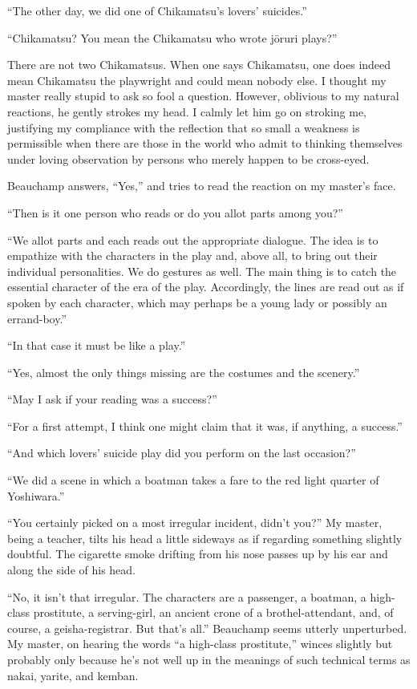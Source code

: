 \documentclass{book}
\begin{document}
``The other day, we did one of Chikamatsu's lovers' suicides.''

``Chikamatsu? You mean the Chikamatsu who wrote jōruri plays?''

There are not two Chikamatsus. When one says Chikamatsu, one does indeed
mean Chikamatsu the playwright and could mean nobody else. I thought my
master really stupid to ask so fool a question. However, oblivious to my
natural reactions, he gently strokes my head. I calmly let him go on
stroking me, justifying my compliance with the reflection that so small
a weakness is permissible when there are those in the world who admit to
thinking themselves under loving observation by persons who merely
happen to be cross-eyed.

Beauchamp answers, ``Yes,'' and tries to read the reaction on my
master's face.

``Then is it one person who reads or do you allot parts among you?''

``We allot parts and each reads out the appropriate dialogue. The idea
is to empathize with the characters in the play and, above all, to bring
out their individual personalities. We do gestures as well. The main
thing is to catch the essential character of the era of the play.
Accordingly, the lines are read out as if spoken by each character,
which may perhaps be a young lady or possibly an errand-boy.''

``In that case it must be like a play.''

``Yes, almost the only things missing are the costumes and the
scenery.''

``May I ask if your reading was a success?''

``For a first attempt, I think one might claim that it was, if anything,
a success.''

``And which lovers' suicide play did you perform on the last occasion?''

``We did a scene in which a boatman takes a fare to the red light
quarter of Yoshiwara.''

``You certainly picked on a most irregular incident, didn't you?'' My
master, being a teacher, tilts his head a little sideways as if
regarding something slightly doubtful. The cigarette smoke drifting from
his nose passes up by his ear and along the side of his head.

``No, it isn't that irregular. The characters are a passenger, a
boatman, a high-class prostitute, a serving-girl, an ancient crone of a
brothel-attendant, and, of course, a geisha-registrar. But that's all.''
Beauchamp seems utterly unperturbed. My master, on hearing the words ``a
high-class prostitute,'' winces slightly but probably only because he's
not well up in the meanings of such technical terms as nakai, yarite,
and kemban.
\end{document}
